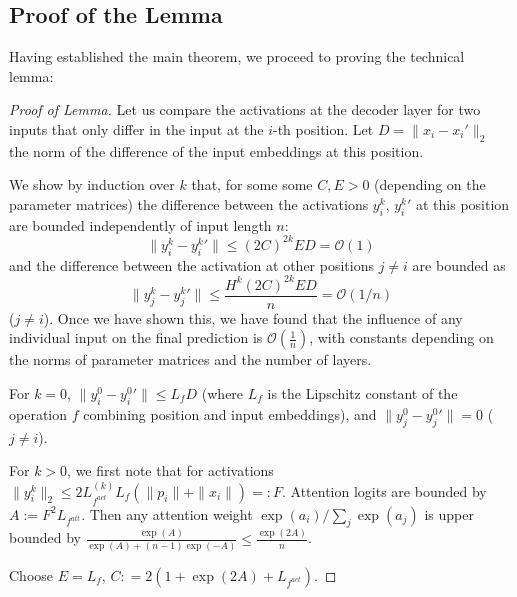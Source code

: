 \documentclass[11pt,a4paper]{article}
\newcounter{theorem}
\begin{document}
\subsection{Proof of the Lemma}
Having established the main theorem, we proceed to proving the technical lemma:
\begin{proof}[Proof of Lemma]
Let us compare the activations at the decoder layer for two inputs that only differ in the input at the $i$-th position.
Let $D = \|x_i-x_i'\|_2$ the norm of the difference of the input embeddings at this position.

	We show by induction over $k$ that, for some some $C, E > 0$ (depending on the parameter matrices) the difference between the activations $y_i^k$, ${y_i^k}'$ at this position are bounded independently of input length $n$:
\begin{equation}
	\|y_i^k-{y_i^k}'\| \leq (2C)^{2k}ED = \mathcal{O}(1)
\end{equation}
and the difference between the activation at other positions $j\neq i$ are bounded as
\begin{equation}
	\|y_j^k-{y_j^k}'\| \leq \frac{H^k (2C)^{2k}ED}{n} = \mathcal{O}(1/n)
\end{equation} ($j \neq i$).
Once we have shown this, we have found that the influence of any individual input on the final prediction is $\mathcal{O}(\frac{1}{n})$, with constants depending on the norms of parameter matrices and the number of layers.


For $k=0$, $\|y_i^0 - {y_i^0}'\| \leq L_f D$ (where $L_f$ is the Lipschitz constant of the operation $f$ combining position and input embeddings), and $\|y_j^0 - {y_j^0}'\| = 0$ ($j \neq i$).

For $k>0$, we first note that for activations $\|y_i^k\|_2 \leq 2 L_{f^{act}}^{(k)} L_f (\|p_i\| + \|x_i\|) =: F$.
Attention logits are bounded by $A := F^2 L_{f^{att}}$.
Then any attention weight $\exp(a_i)/\sum_j \exp(a_j)$ is upper bounded by $\frac{\exp(A)}{\exp(A) + (n-1) \exp(-A)} \leq \frac{\exp(2A)}{n}$.

Choose $E = L_f$, $C : = 2(1 + \exp(2A) + L_{f^{act}})$.


\end{proof}
\end{document}
